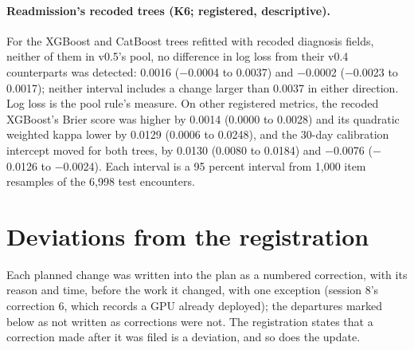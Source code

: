 \documentclass[11pt,letterpaper]{article}
\newcommand{\idn}[1]{#1}%
\begin{document}
\paragraph{Readmission's recoded trees (K6; registered, descriptive).} For the XGBoost and CatBoost trees refitted with recoded diagnosis fields, neither of them in v0.5's pool, no difference in log loss from their v0.4 counterparts was detected: 0.0016 ($-$0.0004 to 0.0037) and $-$0.0002 ($-$0.0023 to 0.0017); neither interval includes a change larger than 0.0037 in either direction. Log loss is the pool rule's measure. On other registered metrics, the recoded XGBoost's Brier score was higher by 0.0014 (0.0000 to 0.0028) and its quadratic weighted kappa lower by 0.0129 (0.0006 to 0.0248), and the 30-day calibration intercept moved for both trees, by 0.0130 (0.0080 to 0.0184) and $-$0.0076 ($-$0.0126 to $-$0.0024). Each interval is a 95 percent interval from 1,000 item resamples of the 6,998 test encounters.

\section{Deviations from the registration}
\label{app:deviations}

Each planned change was written into the plan as a numbered correction, with its reason and time, before the work it changed, with one exception (\idn{session 8's correction 6}, which records a GPU already deployed); the departures marked below as not written as corrections were not. The registration states that a correction made after it was filed is a deviation, and so does the update.
\end{document}
